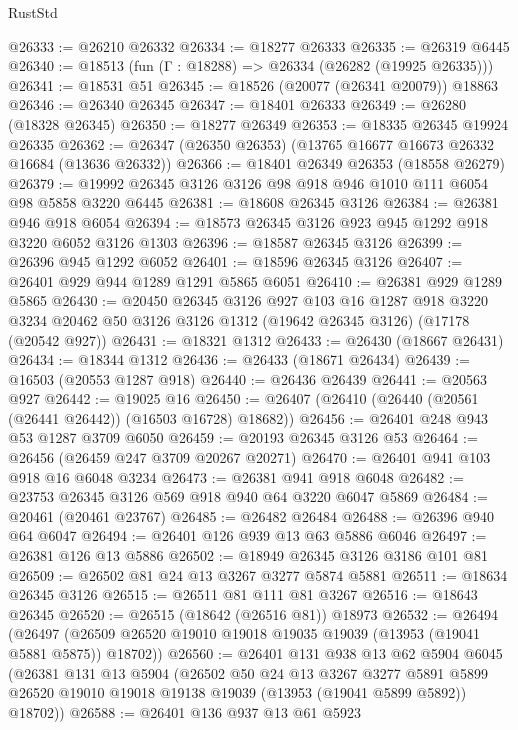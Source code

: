 \begin{lexlean}{RustStd}
\begin{coremodule}
@26333 := @26210 @26332
@26334 := @18277 @26333
@26335 := @26319 @6445
@26340 := @18513 (fun (Γ : @18288) => @26334 (@26282 (@19925 @26335)))
@26341 := @18531 @51
@26345 := @18526 (@20077 (@26341 @20079)) @18863
@26346 := @26340 @26345
@26347 := @18401 @26333
@26349 := @26280 (@18328 @26345)
@26350 := @18277 @26349
@26353 := @18335 @26345 @19924 @26335
@26362 := @26347 (@26350 @26353) (@13765 @16677 @16673 @26332 @16684 (@13636 @26332))
@26366 := @18401 @26349 @26353 (@18558 @26279)
@26379 := @19992 @26345 @3126 @3126 @98 @918 @946 @1010 @111 @6054 @98 @5858 @3220 @6445
@26381 := @18608 @26345 @3126
@26384 := @26381 @946 @918 @6054
@26394 := @18573 @26345 @3126 @923 @945 @1292 @918 @3220 @6052 @3126 @1303
@26396 := @18587 @26345 @3126
@26399 := @26396 @945 @1292 @6052
@26401 := @18596 @26345 @3126
@26407 := @26401 @929 @944 @1289 @1291 @5865 @6051
@26410 := @26381 @929 @1289 @5865
@26430 := @20450
    @26345
    @3126
    @927
    @103
    @16
    @1287
    @918
    @3220
    @3234
    @20462
    @50
    @3126
    @3126
    @1312
    (@19642 @26345 @3126)
    (@17178 (@20542 @927))
@26431 := @18321 @1312
@26433 := @26430 (@18667 @26431)
@26434 := @18344 @1312
@26436 := @26433 (@18671 @26434)
@26439 := @16503 (@20553 @1287 @918)
@26440 := @26436 @26439
@26441 := @20563 @927
@26442 := @19025 @16
@26450 := @26407 (@26410 (@26440 (@20561 (@26441 @26442)) (@16503 @16728) @18682))
@26456 := @26401 @248 @943 @53 @1287 @3709 @6050
@26459 := @20193 @26345 @3126 @53
@26464 := @26456 (@26459 @247 @3709 @20267 @20271)
@26470 := @26401 @941 @103 @918 @16 @6048 @3234
@26473 := @26381 @941 @918 @6048
@26482 := @23753 @26345 @3126 @569 @918 @940 @64 @3220 @6047 @5869
@26484 := @20461 (@20461 @23767)
@26485 := @26482 @26484
@26488 := @26396 @940 @64 @6047
@26494 := @26401 @126 @939 @13 @63 @5886 @6046
@26497 := @26381 @126 @13 @5886
@26502 := @18949 @26345 @3126 @3186 @101 @81
@26509 := @26502 @81 @24 @13 @3267 @3277 @5874 @5881
@26511 := @18634 @26345 @3126
@26515 := @26511 @81 @111 @81 @3267
@26516 := @18643 @26345
@26520 := @26515 (@18642 (@26516 @81)) @18973
@26532 := @26494
    (@26497 (@26509 @26520 @19010 @19018 @19035 @19039 (@13953 (@19041 @5881 @5875)) @18702))
@26560 := @26401
    @131
    @938
    @13
    @62
    @5904
    @6045
    (@26381
      @131
      @13
      @5904
      (@26502
        @50
        @24
        @13
        @3267
        @3277
        @5891
        @5899
        @26520
        @19010
        @19018
        @19138
        @19039
        (@13953 (@19041 @5899 @5892))
        @18702))
@26588 := @26401
    @136
    @937
    @13
    @61
    @5923

\end{coremodule}
\end{lexlean}
